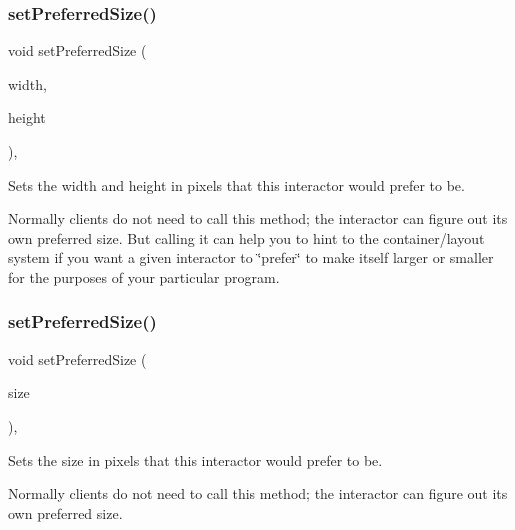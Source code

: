 \subsubsection{\texorpdfstring{set\+Preferred\+Size()}{setPreferredSize()}\hspace{0.1cm}{\footnotesize\ttfamily [1/2]}}
{\footnotesize\ttfamily void set\+Preferred\+Size (\begin{DoxyParamCaption}\item[{double}]{width,  }\item[{double}]{height }\end{DoxyParamCaption})\hspace{0.3cm}{\ttfamily [virtual]}, {\ttfamily [inherited]}}



Sets the width and height in pixels that this interactor would prefer to be. 

Normally clients do not need to call this method; the interactor can figure out its own preferred size. But calling it can help you to hint to the container/layout system if you want a given interactor to \char`\"{}prefer\char`\"{} to make itself larger or smaller for the purposes of your particular program. \mbox{\label{classGInteractor_aa22d9be4bc0e078bb0ea69b0fc9d7c75}} 
\subsubsection{\texorpdfstring{set\+Preferred\+Size()}{setPreferredSize()}\hspace{0.1cm}{\footnotesize\ttfamily [2/2]}}
{\footnotesize\ttfamily void set\+Preferred\+Size (\begin{DoxyParamCaption}\item[{const \mbox{\hyperlink{structGDimension}{G\+Dimension}} \&}]{size }\end{DoxyParamCaption})\hspace{0.3cm}{\ttfamily [virtual]}, {\ttfamily [inherited]}}



Sets the size in pixels that this interactor would prefer to be. 

Normally clients do not need to call this method; the interactor can figure out its own preferred size. \mbox{\label{classGInteractor_a3db429ab2fa52efd187eec0ed8cdd9f2}} 
